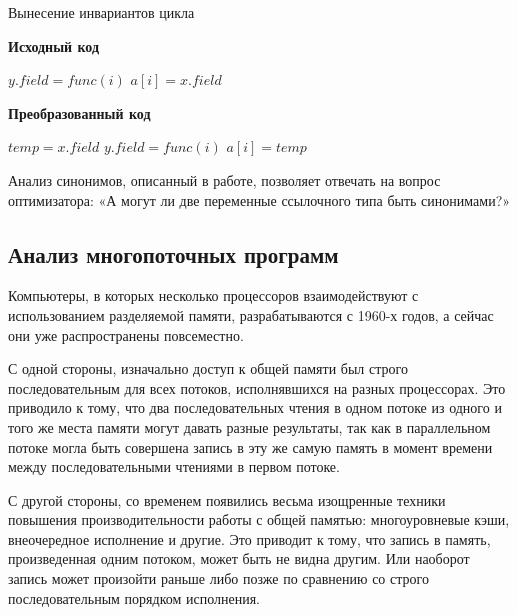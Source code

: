 \documentclass[14pt,titlepage]{extarticle}
\newcommand{\algorithmictitle}[1]{\hspace{8mm}\textbf{#1}}
\begin{document}
      \begin{algorithm}
        \caption{Вынесение инвариантов цикла}
        \label{code:licm}
        \begin{multicols*}{2}
          \algorithmictitle{Исходный код}
          \begin{algorithmic}[1]
            \STATE $y.field = func(i)$
            \STATE $a[i] = x.field$
            \ENDFOR
          \end{algorithmic}
          \columnbreak
          \algorithmictitle{Преобразованный код}
          \begin{algorithmic}[1]
            \STATE $temp = x.field$
            \STATE $y.field = func(i)$
            \STATE $a[i] = temp$
            \ENDFOR
          \end{algorithmic}
        \end{multicols*}
      \end{algorithm}

      Анализ синонимов, описанный в работе, позволяет отвечать на
      вопрос оптимизатора: «А могут ли две переменные ссылочного типа быть
      синонимами?»

    \subsection{Анализ многопоточных программ}
      \label{section:intro_to_multithreading}

      Компьютеры, в которых несколько процессоров взаимодействуют с
      использованием разделяемой памяти, разрабатываются с 1960-х годов, а
      сейчас они уже распространены повсеместно.

      С одной стороны, изначально доступ к общей памяти был строго
      последовательным для всех потоков, исполнявшихся на разных процессорах.
      Это приводило к тому, что два последовательных чтения в одном потоке из
      одного и того же места памяти могут давать разные результаты, так как в
      параллельном потоке могла быть совершена запись в эту же самую память в
      момент времени между последовательными чтениями в первом потоке.

      С другой стороны, со временем появились весьма изощренные техники
      повышения производительности работы с общей памятью: многоуровневые кэши,
      внеочередное исполнение и другие.
      Это приводит к тому, что запись в память, произведенная одним потоком,
      может быть не видна другим. Или наоборот запись может произойти раньше
      либо позже по сравнению со строго последовательным порядком исполнения.
\end{document}
